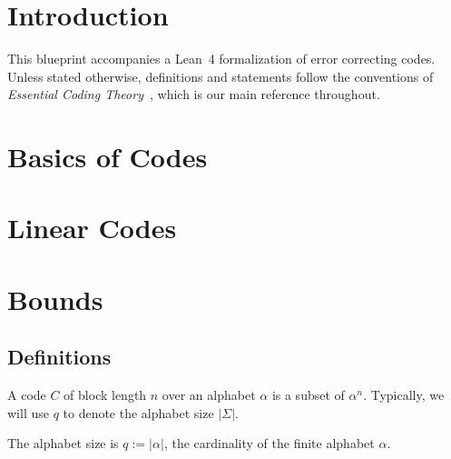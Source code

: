 
%
\chapter{Introduction}

This blueprint accompanies a Lean~4 formalization of error correcting codes.
Unless stated otherwise, definitions and statements follow the conventions of
\emph{Essential Coding Theory}~\cite{GRS}, which is our main reference throughout.

\chapter{Basics of Codes}


\chapter{Linear Codes}


\chapter{Bounds}



\section{Definitions}
\begin{definition}[Code]
\label{def:Code}
\leanok
A code $C$ of block length $n$ over an alphabet $\alpha$ is a subset of $\alpha^{n}$.
Typically, we will use $q$ to denote the alphabet size $|\Sigma|$.
\end{definition}

\begin{definition}
    \label{def:q}
    \leanok
    The alphabet size is $q := \lvert\alpha\rvert$, the cardinality of the finite alphabet $\alpha$.
\end{definition}

